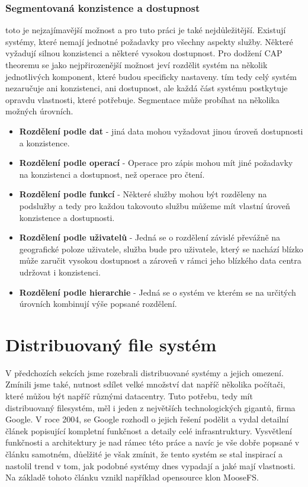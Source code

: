 \subsubsection{Segmentovaná konzistence a dostupnost}
toto je nejzajímavější možnost a pro tuto práci je také nejdůležitější. Existují systémy, které nemají jednotné požadavky pro všechny aspekty služby. Některé vyžadují silnou konzistenci a některé vysokou dostupnost. Pro dodžení CAP theoremu se  jako nejpřirozenější možnost jeví rozdělit systém na několik jednotlivých komponent, které budou specificky nastaveny. tím tedy celý systém nezaručuje ani konzistenci, ani dostupnost, ale každá část systému postkytuje opravdu vlastnosti, které potřebuje. Segmentace může probíhat na několika možných úrovních. 

\begin{itemize}
\item \textbf{Rozdělení podle dat} - jiná data mohou vyžadovat jinou úroveň dostupnosti a konzistence.
\item \textbf{Rozdělení podle operací} - Operace pro zápis mohou mít jiné požadavky na konzistenci a dostupnost, než operace pro čtení.
\item \textbf{Rozdělení podle funkcí} - Některé služby mohou být rozděleny na podslužby a tedy pro každou takovouto službu můžeme mít vlastní úroveň konzistence a dostupnosti. 
\item \textbf{Rozdělení podle uživatelů} - Jedná se o rozdělení závislé převážně na geografické poloze uživatele, služba bude pro uživatele, který se nachází blízko může zaručit vysokou dostupnost a zároveň v rámci jeho blízkého data centra udržovat i konzistenci. 
\item \textbf{Rozdělení podle hierarchie} - Jedná se o systém ve kterém se na určitých úrovních kombinují výše popsané rozdělení.
 
\end{itemize}
\section{Distribuovaný file systém}

V předchozích sekcích jsme rozebrali distribuované systémy a jejich omezení. Zmínili jsme také, nutnost sdílet velké množství dat napříč několika počítači, které můžou být napříč různými datacentry. Tuto potřebu, tedy mít distribuovaný filesystém, měl i jeden z největších technologických gigantů, firma Google. V roce 2004, se Google rozhodl o jejich řešení podělit a vydal detailní článek \cite{gfs} popisující kompletní funkčnost a detaily celé infrasntruktury. Vysvětlení funkčnosti a  architektury je nad rámec této práce a navíc je vše dobře popsané v článku samotném, důelžité je však zmínit, že tento systém se stal inspirací a nastolil trend v tom, jak podobné systémy dnes vypadají a jaké mají vlastnosti. Na základě tohoto článku vznikl například opensource klon MooseFS.

